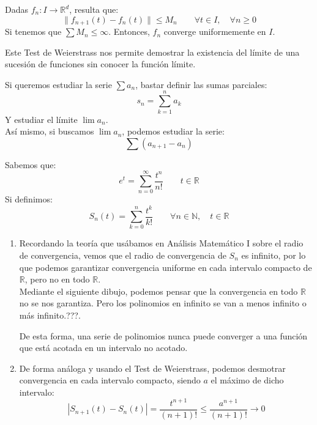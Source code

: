 \begin{prop}
    Dadas $f_n:I\rightarrow\mathbb{R}^d$, resulta que:
    \begin{equation*}
        \|f_{n+1}(t) - f_n(t)\| \leq M_n \qquad \forall t\in I, \quad \forall n\geq 0
    \end{equation*}
    Si tenemos que $\sum M_n \leq \infty$. Entonces, $f_n$ converge uniformemente en $I$.
\end{prop}
Este Test de Weierstrass nos permite demostrar la existencia del límite de una sucesión de funciones sin conocer la función límite.

\begin{observacion}
    Si queremos estudiar la serie $\sum a_n$, bastar definir las sumas parciales:
    \begin{equation*}
        s_n = \sum_{k=1}^{n}a_k
    \end{equation*}
    Y estudiar el límite $\lim a_n$.\\

    Así mismo, si buscamos $\lim a_n$, podemos estudiar la serie:
    \begin{equation*}
        \sum (a_{n+1}-a_n)
    \end{equation*}
\end{observacion}

\begin{ejemplo}
    Sabemos que:
    \begin{equation*}
        e^t = \sum_{n=0}^{\infty} \dfrac{t^n}{n!} \qquad t\in \mathbb{R}
    \end{equation*}
    Si definimos:
    \begin{equation*}
        S_n(t) = \sum_{k=0}^{n} \dfrac{t^k}{k!} \qquad \forall n\in \mathbb{N}, \quad t\in \mathbb{R}
    \end{equation*}

    \begin{enumerate}
        \item Recordando la teoría que usábamos en Análisis Matemático I sobre el radio de convergencia, vemos que el radio de convergencia de $S_n$ es infinito, por lo que podemos garantizar convergencia uniforme en cada intervalo compacto de $\mathbb{R}$, pero no en todo $\mathbb{R}$.\\

    Mediante el siguiente dibujo, podemos pensar que la convergencia en todo $\mathbb{R}$ no se nos garantiza. %
    Pero los polinomios en infinito se van a menos infinito o más infinito.???.

    De esta forma, una serie de polinomios nunca puede converger a una función que está acotada en un intervalo no acotado.
        \item De forma análoga y usando el Test de Weierstrass, podemos desmotrar convergencia en cada intervalo compacto, siendo $a$ el máximo de dicho intervalo:
            \begin{equation*}
                |S_{n+1}(t) - S_n(t)| = \dfrac{t^{n+1}}{(n+1)!} \leq \dfrac{a^{n+1}}{(n+1)!} \longrightarrow 0
            \end{equation*}
    \end{enumerate}
\end{ejemplo}

